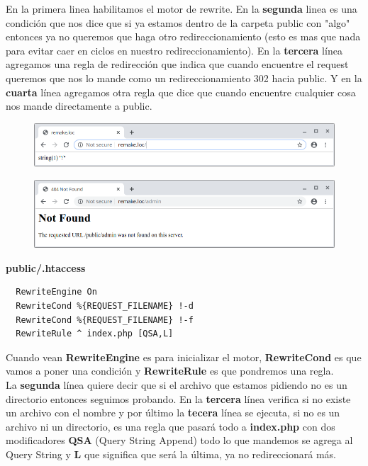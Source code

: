 \documentclass{article}
\begin{document}
En la primera linea habilitamos el motor de rewrite. En la \textbf{segunda}
linea es una condición que nos dice que si ya estamos dentro de la carpeta
public con "algo" entonces ya no queremos que haga otro redireccionamiento
(esto es mas que nada para evitar caer en ciclos en nuestro
redireccionamiento). En la \textbf{tercera} línea agregamos una regla de
redirección que indica que cuando encuentre el request queremos que nos lo
mande como un redireccionamiento 302 hacia public. Y en la \textbf{cuarta}
línea agregamos otra regla que dice que cuando encuentre cualquier cosa nos
mande directamente a public.\\

\begin{figure}[h!]
  \centering
  \includegraphics[scale=0.5]{./Pictures/114_htdocs.png}
\end{figure}

\newpage

\begin{figure}[h!]
  \centering
  \includegraphics[scale=0.5]{./Pictures/114_htdocs_not_found.png}
\end{figure}

\textbf{public/.htaccess}
\begin{verbatim}
  RewriteEngine On
  RewriteCond %{REQUEST_FILENAME} !-d
  RewriteCond %{REQUEST_FILENAME} !-f
  RewriteRule ^ index.php [QSA,L]
\end{verbatim}

Cuando vean \textbf{RewriteEngine} es para inicializar el motor,
\textbf{RewriteCond} es que vamos a poner una condición y \textbf{RewriteRule}
es que pondremos una regla.\\

La \textbf{segunda} línea quiere decir que si el archivo que estamos pidiendo
no es un directorio entonces seguimos probando. En la \textbf{tercera} línea
verifica si no existe un archivo con el nombre y por último la \textbf{tecera}
línea se ejecuta, si no es un archivo ni un directorio, es una regla que pasará
todo a \textbf{index.php} con dos modificadores \textbf{QSA} (Query String
Append) todo lo que mandemos se agrega al Query String y \textbf{L} que
significa que será la última, ya no redireccionará más.\\
\end{document}
